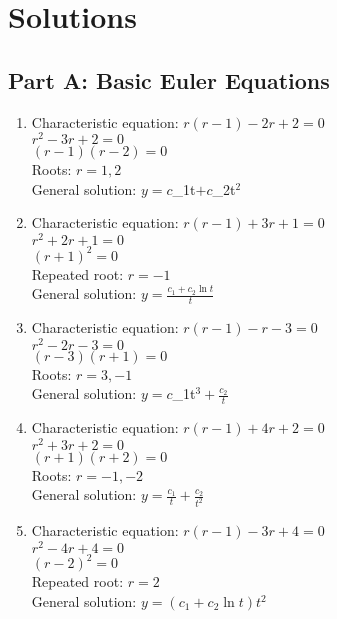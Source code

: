 \documentclass[12pt]{article}
\begin{document}
\newpage

\section*{Solutions}

\subsection*{Part A: Basic Euler Equations}

\begin{enumerate}
\item Characteristic equation: $r(r-1) - 2r + 2 = 0$\\
$r^{2} - 3r + 2 = 0$\\
$(r-1)(r-2) = 0$\\
Roots: $r = 1, 2$\\
General solution: $y = c$_{1t}$ + c$_{2t}$^2$

\item Characteristic equation: $r(r-1) + 3r + 1 = 0$\\
$r^{2} + 2r + 1 = 0$\\
$(r+1)^{2} = 0$\\
Repeated root: $r = -1$\\
General solution: $y = \frac{c_{1} + c_{2}\ln t}{t}$

\item Characteristic equation: $r(r-1) - r - 3 = 0$\\
$r^{2} - 2r - 3 = 0$\\
$(r-3)(r+1) = 0$\\
Roots: $r = 3, -1$\\
General solution: $y = c$_{1t}$^3 + \frac{c_{2}}{t}$

\item Characteristic equation: $r(r-1) + 4r + 2 = 0$\\
$r^{2} + 3r + 2 = 0$\\
$(r+1)(r+2) = 0$\\
Roots: $r = -1, -2$\\
General solution: $y = \frac{c_{1}}{t} + \frac{c_{2}}{t^{2}}$

\item Characteristic equation: $r(r-1) - 3r + 4 = 0$\\
$r^{2} - 4r + 4 = 0$\\
$(r-2)^{2} = 0$\\
Repeated root: $r = 2$\\
General solution: $y = (c_{1} + c_{2}\ln t)t^{2}$
\end{enumerate}
\end{document}
